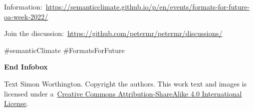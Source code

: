 \documentclass{article}
\begin{document}
Information: \href{https://semanticclimate.github.io/p/en/events/formats-for-future-oa-week-2022/}{https://semanticclimate.github.io/p/en/events/formats-for-future-oa-week-2022/}


Join the discussion: \href{https://github.com/petermr/petermr/discussions/}{https://github.com/petermr/petermr/discussions/}


\#semanticClimate \#FormatsForFuture


\textbf{End Infobox}


Text Simon Worthington. Copyright the authors. This work text and images is licensed under a \href{https://creativecommons.org/licenses/by-sa/4.0/}{Creative Commons Attribution-ShareAlike 4.0 International License}.
\end{document}
